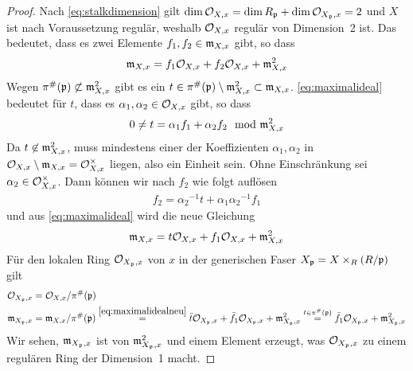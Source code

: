 \begin{Lemma}
\begin{proof}
    Nach \autoref{eq:stalkdimension} gilt
    $\dim\mathcal{O}_{X,x}=\dim R_{\mathfrak{p}}+\dim\mathcal{O}_{X_{\mathfrak{p}},x}=2$ und $X$ ist nach
    Voraussetzung regulär, weshalb $\mathcal{O}_{X,x}$ regulär von Dimension~2
    ist. Das bedeutet, dass es zwei Elemente $f_1, f_2\in\mathfrak{m}_{X,x}$
    gibt, so dass
    \begin{gather}\label{eq:maximalideal}
      \mathfrak{m}_{X,x} = f_1\mathcal{O}_{X,x} + f_2\mathcal{O}_{X,x} + \mathfrak{m}_{X,x}^2
    \end{gather}
    Wegen $\pi^\#(\mathfrak{p})\not\subset\mathfrak{m}_{X,x}^2$ gibt es ein
    $t\in\pi^\#(\mathfrak{p})\setminus\mathfrak{m}_{X,x}^2\subset\mathfrak{m}_{X,x}$.
    \eqref{eq:maximalideal} bedeutet für $t$, dass es $\alpha_1,
    \alpha_2\in\mathcal{O}_{X,x}$ gibt, so dass
    \begin{gather*}
      0 \neq t = \alpha_1 f_1 + \alpha_2 f_2 \mod {\mathfrak{m}}_{X,x}^2
    \end{gather*}
    Da $t\not\in\mathfrak{m}_{X,x}^2$, muss mindestens einer der Koeffizienten
    $\alpha_1,\alpha_2$ in $\mathcal{O}_{X,x}\setminus\mathfrak{m}_{X,x}=\mathcal{O}_{X,x}^\times$
    liegen, also ein Einheit sein. Ohne Einschränkung sei
    $\alpha_2\in\mathcal{O}_{X,x}^\times$. Dann können wir nach $f_2$ wie folgt
    auflösen
    \begin{gather*}
      f_2 = {\alpha_2}^{-1}t + {\alpha_1}{\alpha_2}^{-1}f_1 
    \end{gather*}
    und aus \eqref{eq:maximalideal} wird die neue Gleichung
    \begin{gather}\label{eq:maximalidealneu}
      \mathfrak{m}_{X,x} = t\mathcal{O}_{X,x} + f_1\mathcal{O}_{X,x} + \mathfrak{m}_{X,x}^2
    \end{gather}
    Für den lokalen Ring $\mathcal{O}_{X_{\mathfrak{p}},x}$ von $x$ in der generischen
    Faser $X_{\mathfrak{p}} = X\times_R (R/\mathfrak{p})$ gilt
    \begin{align*}
      \mathcal{O}_{X_{\mathfrak{p}},x} &= \mathcal{O}_{X,x}/\pi^\#(\mathfrak{p})\\
      \mathfrak{m}_{X_{\mathfrak{p}},x} &= \mathfrak{m}_{X,x}/\pi^\#(\mathfrak{p})
                    \overset{\eqref{eq:maximalidealneu}}{=}
                    \bar t\mathcal{O}_{X_{\mathfrak{p}},x} + \bar f_1\mathcal{O}_{X_{\mathfrak{p}},x} +
                    \mathfrak{m}_{X_{\mathfrak{p}},x}^2
                    \overset{t\in\pi^\#(\mathfrak{p})}{=}
                    \bar f_1\mathcal{O}_{X_{\mathfrak{p}},x} + \mathfrak{m}_{X_{\mathfrak{p}},x}^2 
    \end{align*}
    Wir sehen, $\mathfrak{m}_{X_{\mathfrak{p}},x}$ ist von $\mathfrak{m}_{X_{\mathfrak{p}},x}^2$ und einem Element
    erzeugt, was $\mathcal{O}_{X_{\mathfrak{p}},x}$ zu einem regulären Ring der Dimension~1
    macht.
  \end{proof}
\end{Lemma}

